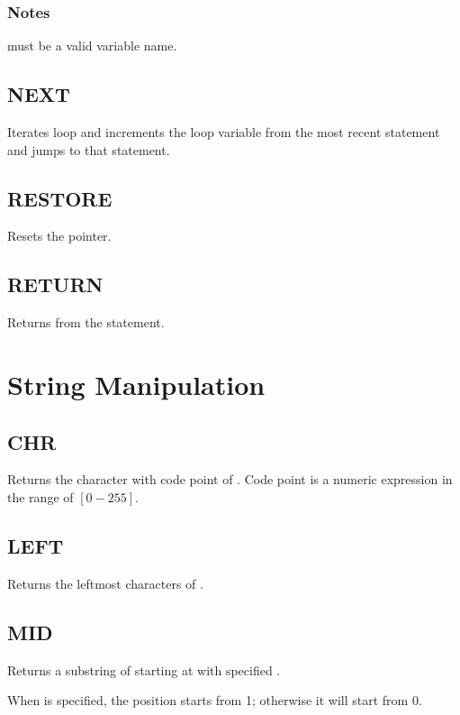         \subsubsection*{Notes}
        \begin{itemlist}
        \item {} must be a valid variable name.
        \end{itemlist}
    \subsection{NEXT}
        \par
        Iterates  loop and increments the loop variable from the most recent  statement and jumps to that statement.
    \subsection{RESTORE}
        \par
        Resets the  pointer.
    \subsection{RETURN}
        \par
        Returns from the  statement.

\section{String Manipulation}

    \subsection{CHR}
        \par
        Returns the character with code point of . Code point is a numeric expression in the range of $[0-255]$.
    \subsection{LEFT}
        \par
        Returns the leftmost  characters of .
    \subsection{MID}
        \par
        Returns a substring of  starting at  with specified .\par
        When  is specified, the position starts from 1; otherwise it will start from 0. 
